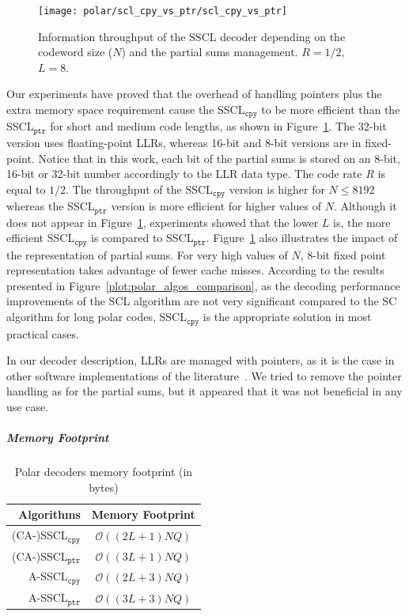 \begin{figure}
  \centering
  \texttt{[image: polar/scl\_cpy\_vs\_ptr/scl\_cpy\_vs\_ptr]}
  \caption{Information throughput of the SSCL decoder depending on the codeword
    size ($N$) and the partial sums management. $R = 1 / 2$, $L = 8$.}
  \label{plot:polar_scl_cpy_vs_ptr}
\end{figure}

Our experiments have proved that the overhead of handling pointers plus the
extra memory space requirement cause the SSCL$_{\texttt{cpy}}$ to be more
efficient than the SSCL$_{\texttt{ptr}}$ for short and medium code lengths, as
shown in Figure~\ref{plot:polar_scl_cpy_vs_ptr}. The 32-bit version uses
floating-point LLRs, whereas 16-bit and 8-bit versions are in fixed-point.
Notice that in this work, each bit of the partial sums is stored on an 8-bit,
16-bit or 32-bit number accordingly to the LLR data type. The code rate $R$ is
equal to $1/2$. The throughput of the SSCL$_{\texttt{cpy}}$ version is higher
for $N \leq 8192$ whereas the SSCL$_{\texttt{ptr}}$ version is more efficient
for higher values of $N$. Although it does not appear in
Figure~\ref{plot:polar_scl_cpy_vs_ptr}, experiments showed that the lower $L$
is, the more efficient SSCL$_{\texttt{cpy}}$ is compared to
SSCL$_{\texttt{ptr}}$. Figure~\ref{plot:polar_scl_cpy_vs_ptr} also illustrates
the impact of the representation of partial sums. For very high values of $N$,
8-bit fixed point representation takes advantage of fewer cache misses.
According to the results presented in Figure~\ref{plot:polar_algos_comparison},
as the decoding performance improvements of the SCL algorithm are not very
significant compared to the SC algorithm for long polar codes,
SSCL$_{\texttt{cpy}}$ is the appropriate solution in most practical cases.

In our decoder description, LLRs are managed with pointers, as it is the case in
other software implementations of the
literature~\cite{Sarkis2014b,Sarkis2016,Shen2016}. We tried to remove the
pointer handling as for the partial sums, but it appeared that it was not
beneficial in any use case.

\subparagraph{Memory Footprint}

\begin{table}
  \centering
  \caption{Polar decoders memory footprint (in bytes)}
  \label{tab:polar_scl_memory_footprint}
   \begin{tabular}{r c}
    \textbf{Algorithms}        & \textbf{Memory Footprint} \\
    \hline
    \hline
    (CA-)SSCL$_{\texttt{cpy}}$ & $\mathcal{O}((2L + 1)NQ)$ \\
    (CA-)SSCL$_{\texttt{ptr}}$ & $\mathcal{O}((3L + 1)NQ)$ \\
    A-SSCL$_{\texttt{cpy}}$    & $\mathcal{O}((2L + 3)NQ)$ \\
    A-SSCL$_{\texttt{ptr}}$    & $\mathcal{O}((3L + 3)NQ)$ \\
  \end{tabular}
\end{table}

